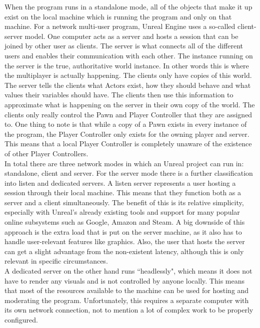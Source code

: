 When the program runs in a standalone mode, all of the objects that make it up exist on the local machine which is running the program and only on that machine. For a network multi-user program, Unreal Engine uses a so-called client-server model\cite{bib:NetworkComp}. One computer acts as a server and hosts a session that can be joined by other user as clients. The server is what connects all of the different users and enables their communication with each other. The instance running on the server is the true, authoritative world instance. In other words this is where the multiplayer is actually happening. The clients only have copies of this world. The server tells the clients what Actors exist, how they should behave and what values their variables should have. The clients then use this information to approximate what is happening on the server in their own copy of the world. The clients only really control the Pawn and Player Controller that they are assigned to. One thing to note is that while a copy of a Pawn exists in every instance of the program, the Player Controller only exists for the owning player and server. This means that a local Player Controller is completely unaware of the existence of other Player Controllers.\\

In total there are three network modes in which an Unreal project can run in: standalone, client and server\cite{bib:NetworkComp}. For the server mode there is a further classification into listen and dedicated servers. A listen server represents a user hosting a session through their local machine. This means that they function both as a server and a client simultaneously. The benefit of this is its relative simplicity, especially with Unreal's already existing tools and support for many popular online subsystems such as Google, Amazon and Steam\cite{bib:UEOnlSuS}. A big downside of this approach is the extra load that is put on the server machine, as it also has to handle user-relevant features like graphics. Also, the user that hosts the server can get a slight advantage from the non-existent latency, although this is only relevant in specific circumstances.\\
A dedicated server on the other hand runs ``headlessly", which means it does not have to render any visuals and is not controlled by anyone locally. This means that most of the resources available to the machine can be used for hosting and moderating the program. Unfortunately, this requires a separate computer with its own network connection, not to mention a lot of complex work to be properly configured.\\

